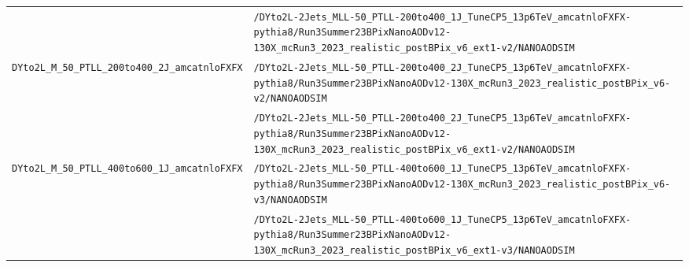 \begin{longtable}{@{}>{\RaggedRight\arraybackslash}p{} >{\RaggedRight\arraybackslash}p{}@{}}
 & \texttt{/\allowbreak{}DYto2L-\allowbreak{}2Jets\_\allowbreak{}MLL-\allowbreak{}50\_\allowbreak{}PTLL-\allowbreak{}200to400\_\allowbreak{}1J\_\allowbreak{}TuneCP5\_\allowbreak{}13p6TeV\_\allowbreak{}amcatnloFXFX-\allowbreak{}pythia8/\allowbreak{}Run3Summer23BPixNanoAODv12-\allowbreak{}130X\_\allowbreak{}mcRun3\_\allowbreak{}2023\_\allowbreak{}realistic\_\allowbreak{}postBPix\_\allowbreak{}v6\_\allowbreak{}ext1-\allowbreak{}v2/\allowbreak{}NANOAODSIM} \\
\addlinespace[2pt]
\texttt{DYto2L\_\allowbreak{}M\_\allowbreak{}50\_\allowbreak{}PTLL\_\allowbreak{}200to400\_\allowbreak{}2J\_\allowbreak{}amcatnloFXFX} & \texttt{/\allowbreak{}DYto2L-\allowbreak{}2Jets\_\allowbreak{}MLL-\allowbreak{}50\_\allowbreak{}PTLL-\allowbreak{}200to400\_\allowbreak{}2J\_\allowbreak{}TuneCP5\_\allowbreak{}13p6TeV\_\allowbreak{}amcatnloFXFX-\allowbreak{}pythia8/\allowbreak{}Run3Summer23BPixNanoAODv12-\allowbreak{}130X\_\allowbreak{}mcRun3\_\allowbreak{}2023\_\allowbreak{}realistic\_\allowbreak{}postBPix\_\allowbreak{}v6-\allowbreak{}v2/\allowbreak{}NANOAODSIM} \\
 & \texttt{/\allowbreak{}DYto2L-\allowbreak{}2Jets\_\allowbreak{}MLL-\allowbreak{}50\_\allowbreak{}PTLL-\allowbreak{}200to400\_\allowbreak{}2J\_\allowbreak{}TuneCP5\_\allowbreak{}13p6TeV\_\allowbreak{}amcatnloFXFX-\allowbreak{}pythia8/\allowbreak{}Run3Summer23BPixNanoAODv12-\allowbreak{}130X\_\allowbreak{}mcRun3\_\allowbreak{}2023\_\allowbreak{}realistic\_\allowbreak{}postBPix\_\allowbreak{}v6\_\allowbreak{}ext1-\allowbreak{}v2/\allowbreak{}NANOAODSIM} \\
\addlinespace[2pt]
\texttt{DYto2L\_\allowbreak{}M\_\allowbreak{}50\_\allowbreak{}PTLL\_\allowbreak{}400to600\_\allowbreak{}1J\_\allowbreak{}amcatnloFXFX} & \texttt{/\allowbreak{}DYto2L-\allowbreak{}2Jets\_\allowbreak{}MLL-\allowbreak{}50\_\allowbreak{}PTLL-\allowbreak{}400to600\_\allowbreak{}1J\_\allowbreak{}TuneCP5\_\allowbreak{}13p6TeV\_\allowbreak{}amcatnloFXFX-\allowbreak{}pythia8/\allowbreak{}Run3Summer23BPixNanoAODv12-\allowbreak{}130X\_\allowbreak{}mcRun3\_\allowbreak{}2023\_\allowbreak{}realistic\_\allowbreak{}postBPix\_\allowbreak{}v6-\allowbreak{}v3/\allowbreak{}NANOAODSIM} \\
 & \texttt{/\allowbreak{}DYto2L-\allowbreak{}2Jets\_\allowbreak{}MLL-\allowbreak{}50\_\allowbreak{}PTLL-\allowbreak{}400to600\_\allowbreak{}1J\_\allowbreak{}TuneCP5\_\allowbreak{}13p6TeV\_\allowbreak{}amcatnloFXFX-\allowbreak{}pythia8/\allowbreak{}Run3Summer23BPixNanoAODv12-\allowbreak{}130X\_\allowbreak{}mcRun3\_\allowbreak{}2023\_\allowbreak{}realistic\_\allowbreak{}postBPix\_\allowbreak{}v6\_\allowbreak{}ext1-\allowbreak{}v3/\allowbreak{}NANOAODSIM} \\

\end{longtable}
